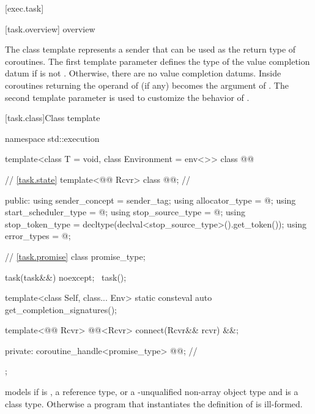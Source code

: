 [exec.task]{}

[task.overview]{ overview}

\pnum
The  class template represents a sender that can
be used as the return type of coroutines.
The first template parameter  defines the type of the value
completion datum if  is not .
Otherwise, there are no value completion datums.
Inside coroutines returning  the operand of
 (if any) becomes the argument of .
The second template parameter  is used to customize
the behavior of .

[task.class]{Class template }

\begin{codeblock}
namespace std::execution {
  template<class T = void, class Environment = env<>>
  class @@ {
    // \ref{task.state}
    template<@@ Rcvr>
      class @@;                              // \expos

  public:
    using sender_concept = sender_tag;
    using allocator_type = @\seebelow@;
    using start_scheduler_type = @\seebelow@;
    using stop_source_type = @\seebelow@;
    using stop_token_type = decltype(declval<stop_source_type>().get_token());
    using error_types = @\seebelow@;

    // \ref{task.promise}
    class promise_type;

    task(task&&) noexcept;
    ~task();

    template<class Self, class... Env>
      static consteval auto get_completion_signatures();

    template<@@ Rcvr>
      @@<Rcvr> connect(Rcvr&& rcvr) &&;

  private:
    coroutine_handle<promise_type> @@;      // \expos
  };
}
\end{codeblock}

\pnum
{} models 
if  is , a reference type, or a \cv{}-unqualified
non-array object type and  is a class type.
Otherwise a program that instantiates the definition of 
is ill-formed.

